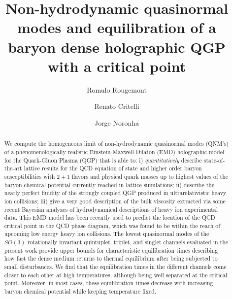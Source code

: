 \documentclass[aps,prd,showkeys,superscriptaddress,singlecolumn,nofootinbib,floatfix]{revtex4-1}
\begin{document}
\title{Non-hydrodynamic quasinormal modes and equilibration of a baryon dense holographic QGP with a critical point}

\author{Romulo Rougemont}

\author{Renato Critelli}

\author{Jorge Noronha}


\begin{abstract}
We compute the homogeneous limit of non-hydrodynamic quasinormal modes (QNM's) of a phenomenologically realistic Einstein-Maxwell-Dilaton (EMD) holographic model for the Quark-Gluon Plasma (QGP) that is able to: i) {\it quantitatively} describe state-of-the-art lattice results for the QCD equation of state and higher order baryon susceptibilities with $2+1$ flavors and physical quark masses up to highest values of the baryon chemical potential currently reached in lattice simulations; ii) describe the nearly perfect fluidity of the strongly coupled QGP produced in ultrarelativistic heavy ion collisions; iii) give a very good description of the bulk viscosity extracted via some recent Bayesian analyzes of hydrodynamical descriptions of heavy ion experimental data. This EMD model has been recently used to predict the location of the QCD critical point in the QCD phase diagram, which was found to be within the reach of upcoming low energy heavy ion collisions. The lowest quasinormal modes of the $SO(3)$ rotationally invariant quintuplet, triplet, and singlet channels evaluated in the present work provide upper bounds for characteristic equilibration times describing how fast the dense medium returns to thermal equilibrium after being subjected to small disturbances. We find that the equilibration times in the different channels come closer to each other at high temperatures, although being well separated at the critical point. Moreover, in most cases, these equilibration times decrease with increasing baryon chemical potential while keeping temperature fixed.
\end{abstract}
\end{document}
